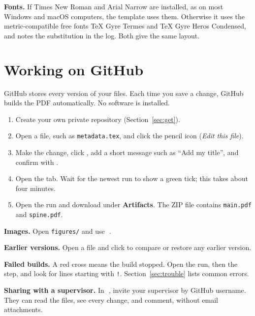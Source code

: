 \documentclass[11pt,a4paper]{article}
\newcommand\file[1]{\texttt{#1}}
\newcommand\then{\,\textrightarrow\,}
\begin{document}
\textbf{Fonts.} If Times New Roman and Arial Narrow are installed, as on most
Windows and macOS computers, the template uses them. Otherwise it uses the
metric-compatible free fonts TeX Gyre Termes and TeX Gyre Heros Condensed, and
notes the substitution in the log. Both give the same layout.

\section{Working on GitHub}\label{sec:github}

GitHub stores every version of your files. Each time you save a change, GitHub
builds the PDF automatically. No software is installed.

\begin{enumerate}
  \item Create your own private repository (Section~\ref{sec:get}).
  \item Open a file, such as \file{metadata.tex}, and click the pencil icon
        (\emph{Edit this file}).
  \item Make the change, click , add a short message
        such as ``Add my title'', and confirm with .
  \item Open the  tab. Wait for the newest run to show a green tick;
        this takes about four minutes.
  \item Open the run and download  under \textbf{Artifacts}.
        The ZIP file contains \file{main.pdf} and \file{spine.pdf}.
\end{enumerate}

\textbf{Images.} Open \file{figures/} and use \then{}.

\textbf{Earlier versions.} Open a file and click  to compare or
restore any earlier version.

\textbf{Failed builds.} A red cross means the build stopped. Open the run, then
the  step, and look for lines starting with \texttt{!}.
Section~\ref{sec:trouble} lists common errors.

\textbf{Sharing with a supervisor.} In \then{},
invite your supervisor by GitHub username. They can read the files, see every
change, and comment, without email attachments.
\end{document}
